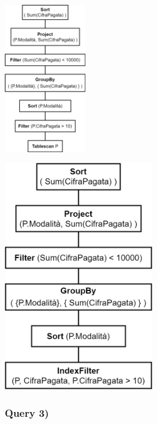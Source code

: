 \documentclass[a4paper,12pt]{article}
\begin{document}
\begin{minipage}{\textwidth}
\begin{multicols}{2}

\null \vfill
\includegraphics[height=6.5cm]{ Albero fisico 2.png }
\vfill \null

\columnbreak

\includegraphics[height=10cm]{ Albero fisico 2 indici.png }
\end{multicols}
\end{minipage}

 \subsubsection{ Query 3) }
\end{document}
